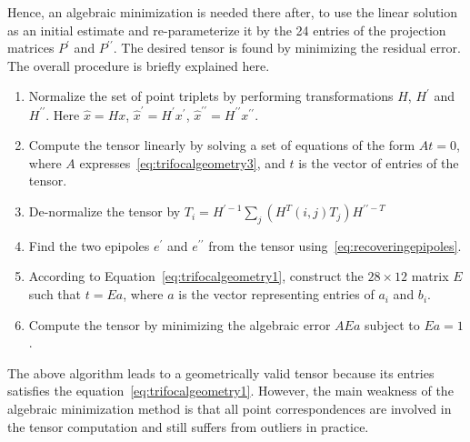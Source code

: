 Hence, an algebraic minimization is needed there after, to use the linear solution as an initial estimate and re-parameterize it by the 24 entries of the projection matrices $P^\prime$ and $P^{\prime \prime}$. The desired tensor is found by minimizing the residual error. The overall procedure is briefly explained here.
\begin{enumerate}
  \item Normalize the set of point triplets by performing transformations $H$, $H^{\prime}$ and $H^{\prime \prime}$. Here $\hat{x} = Hx$, $\hat{x}^{\prime} = H^{\prime}x^{\prime}$, $\hat{x}^{\prime \prime} = H^{\prime \prime} x^{\prime \prime}$.
  \item Compute the tensor linearly by solving a set of equations of the form $At = 0$, where $A$ expresses~\ref{eq:trifocalgeometry3}, and $t$ is the vector of entries of the tensor.
  \item De-normalize the tensor by $T_i = H^{\prime -1} \sum_{j}(H^{T}(i,j)T_j)H^{\prime \prime -T}$
  \item Find the two epipoles $e^{\prime}$ and $e^{\prime \prime}$ from the tensor using~\ref{eq:recoveringepipoles}.
  \item According to Equation~\ref{eq:trifocalgeometry1}, construct the $28 \times 12$ matrix $E$ such that $t = Ea$, where $a$ is the vector representing entries of $a_i$ and $b_i$.
  \item Compute the tensor by minimizing the algebraic error $AEa$ subject to $Ea = 1$.
\end{enumerate}

The above algorithm leads to a geometrically valid tensor because its entries satisfies the equation~\ref{eq:trifocalgeometry1}. However, the main weakness of the algebraic minimization method is that all point correspondences are involved in the tensor computation and still suffers from outliers in practice.
